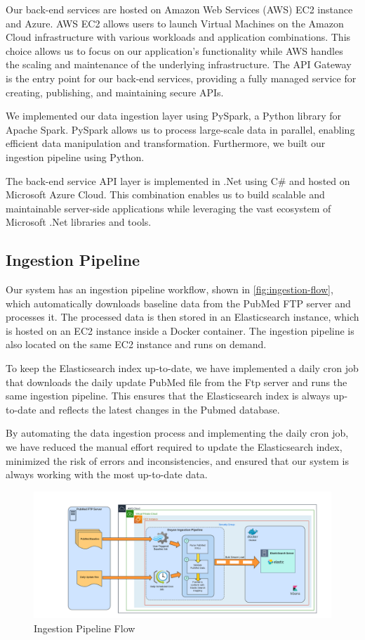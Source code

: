 Our back-end services are hosted on Amazon Web Services (AWS) EC2 instance and Azure. AWS EC2 allows users to launch Virtual Machines on the Amazon Cloud infrastructure with various workloads and application combinations. This choice allows us to focus on our application's functionality while AWS handles the scaling and maintenance of the underlying infrastructure. The API Gateway is the entry point for our back-end services, providing a fully managed service for creating, publishing, and maintaining secure APIs.

We implemented our data ingestion layer  using PySpark, a Python library for Apache Spark. PySpark allows us to process large-scale data in parallel, enabling efficient data manipulation and transformation. Furthermore, we built our ingestion pipeline using Python.

The back-end service API layer is implemented in .Net using C\# and hosted on Microsoft Azure Cloud. This combination enables us to build scalable and maintainable server-side applications while leveraging the vast ecosystem of Microsoft .Net libraries and tools.

\subsection{Ingestion Pipeline}

Our system has an ingestion pipeline workflow, shown in \autoref{fig:ingestion-flow}, which automatically downloads baseline data from the PubMed FTP server and processes it. The processed data is then stored in an Elasticsearch instance, which is hosted on an EC2 instance inside a Docker container. The ingestion pipeline is also located on the same EC2 instance and runs on demand.

To keep the Elasticsearch index up-to-date, we have implemented a daily cron job that downloads the daily update PubMed file from the Ftp server and runs the same ingestion pipeline. This ensures that the Elasticsearch index is always up-to-date and reflects the latest changes in the Pubmed database.

By automating the data ingestion process and implementing the daily cron job, we have reduced the manual effort required to update the Elasticsearch index, minimized the risk of errors and inconsistencies, and ensured that our system is always working with the most up-to-date data.

\begin{figure}[htp]
    \centering
    \includegraphics[width=\textwidth]{Images/Ingestion Pipeline flow.png}
    \caption{Ingestion Pipeline Flow}
    \label{fig:ingestion-flow}
\end{figure}


